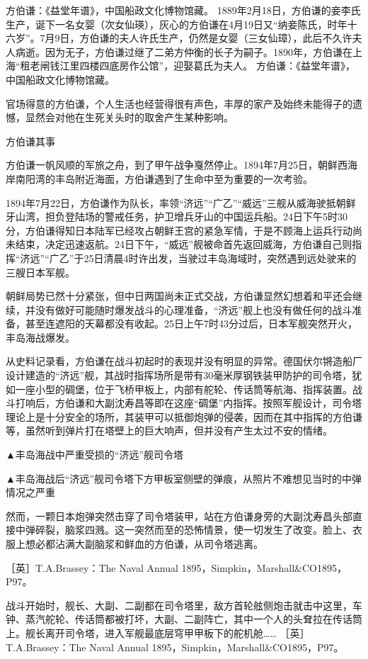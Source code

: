 \documentclass[12pt,UTF8]{ctexbook}
\begin{document}
方伯谦：《益堂年谱》，中国船政文化博物馆藏。
1889年2月18日，方伯谦的妾李氏生产，诞下一名女婴（次女仙瑛），灰心的方伯谦在4月19日又“纳妾陈氏，时年十六岁”。7月9日，方伯谦的夫人许氏生产，仍然是女婴（三女仙璋），此后不久许夫人病逝。因为无子，方伯谦过继了二弟方仲衡的长子为嗣子。1890年，方伯谦在上海“租老闸钱江里四楼四底房作公馆”，迎娶葛氏为夫人。 方伯谦：《益堂年谱》，中国船政文化博物馆藏。

官场得意的方伯谦，个人生活也经营得很有声色，丰厚的家产及始终未能得子的遗憾，显然会对他在生死关头时的取舍产生某种影响。

方伯谦其事

方伯谦一帆风顺的军旅之舟，到了甲午战争戛然停止。1894年7月25日，朝鲜西海岸南阳湾的丰岛附近海面，方伯谦遇到了生命中至为重要的一次考验。

1894年7月22日，方伯谦作为队长，率领“济远”“广乙”“威远”三舰从威海驶抵朝鲜牙山湾，担负登陆场的警戒任务，护卫增兵牙山的中国运兵船。24日下午5时30分，方伯谦得知日本陆军已经攻占朝鲜王宫的紧急军情，于是不顾海上运兵行动尚未结束，决定迅速返航。24日下午，“威远”舰被命首先返回威海，方伯谦自己则指挥“济远”“广乙”于25日清晨4时许出发，当驶过丰岛海域时，突然遇到远处驶来的三艘日本军舰。

朝鲜局势已然十分紧张，但中日两国尚未正式交战，方伯谦显然幻想着和平还会继续，并没有做好可能随时爆发战斗的心理准备，“济远”舰上也没有做任何的战斗准备，甚至连遮阳的天幕都没有收起。25日上午7时43分过后，日本军舰突然开火，丰岛海战爆发。

从史料记录看，方伯谦在战斗初起时的表现并没有明显的异常。德国伏尔锵造船厂设计建造的“济远”舰，其战时指挥场所是带有30毫米厚钢铁装甲防护的司令塔，犹如一座小型的碉堡，位于飞桥甲板上，内部有舵轮、传话筒等航海、指挥装置。战斗打响后，方伯谦和大副沈寿昌等即在这座“碉堡”内指挥。按照军舰设计，司令塔理论上是十分安全的场所，其装甲可以抵御炮弹的侵袭，因而在其中指挥的方伯谦等，虽然听到弹片打在塔壁上的巨大响声，但并没有产生太过不安的情绪。


▲丰岛海战中严重受损的“济远”舰司令塔


▲丰岛海战后“济远”舰司令塔下方甲板室侧壁的弹痕，从照片不难想见当时的中弹情况之严重

然而，一颗日本炮弹突然击穿了司令塔装甲，站在方伯谦身旁的大副沈寿昌头部直接中弹碎裂，脑浆四溅。这一突然而至的恐怖情景，使一切发生了改变。脸上、衣服上想必都沾满大副脑浆和鲜血的方伯谦，从司令塔逃离。

［英］T.A.Brassey：The Naval Annual 1895，Simpkin，Marshall\&CO1895，P97。

战斗开始时，舰长、大副、二副都在司令塔里，敌方首轮舷侧炮击就击中这里，车钟、蒸汽舵轮、传话筒都被打坏，大副、二副阵亡，其中一个人的头耷拉在传话筒上。舰长离开司令塔，进入军舰最底层穹甲甲板下的舵机舱…… ［英］T.A.Brassey：The Naval Annual 1895，Simpkin，Marshall\&CO1895，P97。
\end{document}

